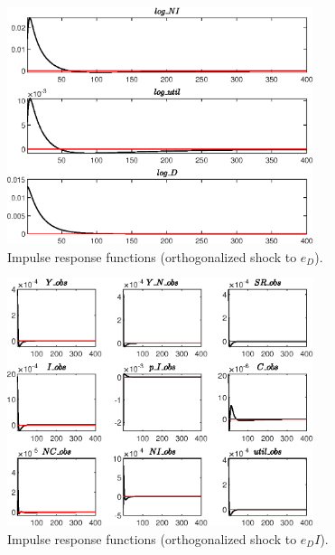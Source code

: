 \begin{figure}[H]
\centering 
\includegraphics[width=0.80\textwidth]{BRS_growth/graphs/BRS_growth_IRF_e_D3}
\caption{Impulse response functions (orthogonalized shock to ${e_D}$).}\label{Fig:IRF:e_D:3}
\end{figure}
 
\begin{figure}[H]
\centering 
\includegraphics[width=0.80\textwidth]{BRS_growth/graphs/BRS_growth_IRF_e_DI1}
\caption{Impulse response functions (orthogonalized shock to ${e_DI}$).}\label{Fig:IRF:e_DI:1}
\end{figure}
 
